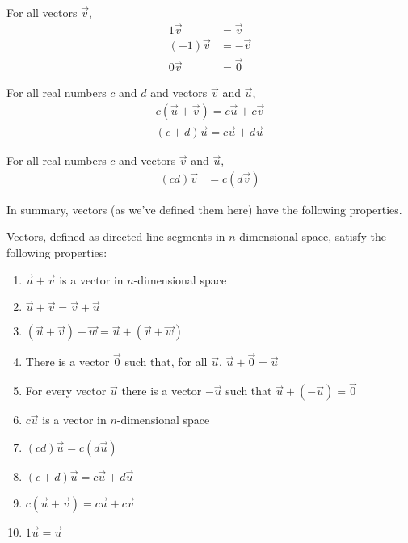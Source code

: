 \begin{proposition}
	For all vectors $\vec{v}$,
	\begin{align*}
	1 \vec{v} &= \vec{v} \\
	(-1) \vec{v} &= -\vec{v} \\
	0 \vec{v} &= \vec{0}
	\end{align*}
\end{proposition}

\begin{proposition}
	For all real numbers $c$ and $d$ and vectors $\vec{v}$ and $\vec{u}$,
	\begin{align*}
	c(\vec{u}+ \vec{v}) = c\vec{u} + c\vec{v} \\
	(c+d)\vec{u} = c \vec{u} + d\vec{u}
	\end{align*}
\end{proposition}

\begin{proposition}
	For all real numbers $c$ and vectors $\vec{v}$ and $\vec{u}$,
	\begin{align*}
	(cd)\vec{v} &= c(d\vec{v}) 
	\end{align*}
\end{proposition}

In summary, vectors (as we've defined them here) have the following properties.

\begin{theorem}\label{thm:vecprops}
	Vectors, defined as directed line segments in $n$-dimensional space, satisfy the following properties:
	\begin{enumerate}
		\item $\vec{u} + \vec{v}$ is a vector in $n$-dimensional space
		\item $\vec{u} + \vec{v} = \vec{v} + \vec{u}$
		\item $(\vec{u}+\vec{v}) + \vec{w} = \vec{u} + (\vec{v}+\vec{w})$
		\item There is a vector $\vec{0}$ such that, for all $\vec{u}$, $\vec{u} + \vec{0} = \vec{u}$
		\item For every vector $\vec{u}$ there is a vector $-\vec{u}$ such that $\vec{u} + (-\vec{u}) = \vec{0}$
		\item $c\vec{u}$ is a vector in $n$-dimensional space
		\item $(cd)\vec{u} = c(d\vec{u})$
		\item $(c+d)\vec{u} = c\vec{u} + d\vec{u}$
		\item $c(\vec{u} + \vec{v}) = c\vec{u} + c\vec{v}$
		\item $1\vec{u} = \vec{u}$
	\end{enumerate}
\end{theorem}

